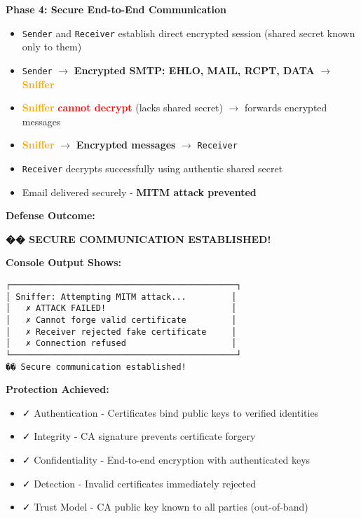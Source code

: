 \documentclass[a4paper,12pt]{extarticle}
\begin{document}
\vspace{0.3cm}
\textbf{Phase 4: Secure End-to-End Communication}
\begin{itemize}[leftmargin=1cm]
    \item \texttt{Sender} and \texttt{Receiver} establish direct encrypted session (shared secret known only to them)
    \item \texttt{Sender} $\rightarrow$ \textcolor{maincolor}{\textbf{Encrypted SMTP: EHLO, MAIL, RCPT, DATA}} $\rightarrow$ \textcolor{orange}{\textbf{Sniffer}}
    \item \textcolor{orange}{\textbf{Sniffer}} \textcolor{red}{\textbf{cannot decrypt}} (lacks shared secret) $\rightarrow$ forwards encrypted messages
    \item \textcolor{orange}{\textbf{Sniffer}} $\rightarrow$ \textcolor{maincolor}{\textbf{Encrypted messages}} $\rightarrow$ \texttt{Receiver}
    \item \texttt{Receiver} decrypts successfully using authentic shared secret
    \item Email delivered securely - \textcolor{green!60!black}{\textbf{MITM attack prevented}}
\end{itemize}

\vspace{0.3cm}
\textbf{Defense Outcome:}
\begin{successbox}
\textcolor{green!60!black}{\textbf{�� SECURE COMMUNICATION ESTABLISHED!}}

\textbf{Console Output Shows:}
\begin{verbatim}
┌─────────────────────────────────────────────┐
│ Sniffer: Attempting MITM attack...         │
│   ✗ ATTACK FAILED!                         │
│   ✗ Cannot forge valid certificate         │
│   ✗ Receiver rejected fake certificate     │
│   ✗ Connection refused                     │
└─────────────────────────────────────────────┘
�� Secure communication established!
\end{verbatim}

\textbf{Protection Achieved:}
\begin{itemize}
    \item ✓ Authentication - Certificates bind public keys to verified identities
    \item ✓ Integrity - CA signature prevents certificate forgery
    \item ✓ Confidentiality - End-to-end encryption with authenticated keys
    \item ✓ Detection - Invalid certificates immediately rejected
    \item ✓ Trust Model - CA public key known to all parties (out-of-band)
\end{itemize}
\end{successbox}
\end{document}
